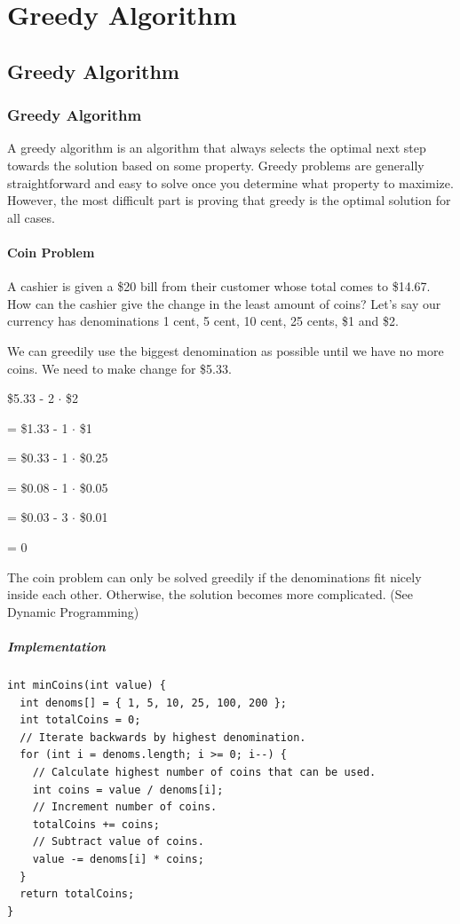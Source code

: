 \documentclass[11pt,oneside]{book}
\begin{document}
\part{ Greedy Algorithm }
    \chapter{ Greedy Algorithm }
        \section{ Greedy Algorithm }
        

A greedy algorithm is an algorithm that always selects the optimal next step towards the solution based on some property. Greedy problems are generally straightforward and easy to solve once you determine what property to maximize. However, the most difficult part is proving that greedy is the optimal solution for all cases.

\subsection{Coin Problem}

A cashier is given a \$20 bill from their customer whose total comes to \$14.67. How can the cashier give the change in the least amount of coins? Let's say our currency has denominations 1 cent, 5 cent, 10 cent, 25 cents, \$1 and \$2.

We can greedily use the biggest denomination as possible until we have no more coins. We need to make change for \$5.33.

\$5.33 - 2 $\cdot$ \$2

= \$1.33 - 1 $\cdot$ \$1

= \$0.33 - 1 $\cdot$ \$0.25

= \$0.08 - 1 $\cdot$ \$0.05

= \$0.03 - 3 $\cdot$ \$0.01

= 0

The coin problem can only be solved greedily if the denominations fit nicely inside each other. Otherwise, the solution becomes more complicated. (See Dynamic Programming)

\subsubsection{Implementation}

\begin{lstlisting}
int minCoins(int value) {
  int denoms[] = { 1, 5, 10, 25, 100, 200 };
  int totalCoins = 0;
  // Iterate backwards by highest denomination.
  for (int i = denoms.length; i >= 0; i--) {
    // Calculate highest number of coins that can be used.
    int coins = value / denoms[i];
    // Increment number of coins.
    totalCoins += coins;
    // Subtract value of coins.
    value -= denoms[i] * coins;
  }
  return totalCoins;
}
\end{lstlisting}
\end{document}
